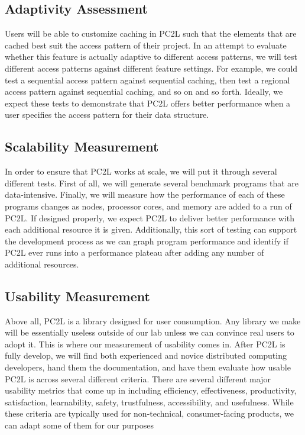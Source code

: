 \subsection{Adaptivity Assessment}
Users will be able to customize  caching in PC2L such that the elements that are cached best suit the access pattern of their project. In an attempt to evaluate whether this feature is actually adaptive to different access patterns, we will test different access patterns against different feature settings. For example, we could test a sequential access pattern against sequential caching, then test a regional access pattern against sequential caching, and so on and so forth. Ideally, we expect these tests to demonstrate that PC2L offers better performance when a user specifies the access pattern for their data structure. 

\subsection{Scalability Measurement}
In order to ensure that PC2L works at scale, we will put it through several different tests. First of all, we will generate several benchmark programs that are data-intensive. Finally, we will measure how the performance of each of these programs changes as nodes, processor cores, and memory are added to a run of PC2L. If designed properly, we expect PC2L to deliver better performance with each additional resource it is given. Additionally, this sort of testing can support the development process as we can graph program performance and identify if PC2L ever runs into a performance plateau after adding any number of additional resources.

\subsection{Usability Measurement}
Above all, PC2L is a library designed for user consumption. Any library we make will be essentially useless outside of our lab unless we can convince real users to adopt it. This is where our measurement of usability comes in. After PC2L is fully develop, we will find both experienced and novice distributed computing developers, hand them the documentation, and have them evaluate how usable PC2L is across several different criteria. There are several different major usability metrics that come up in \cite{use} including efficiency, effectiveness, productivity, satisfaction, learnability, safety, trustfulness, accessibility, and usefulness. While these criteria are typically used for non-technical, consumer-facing products, we can adapt some of them for our purposes


